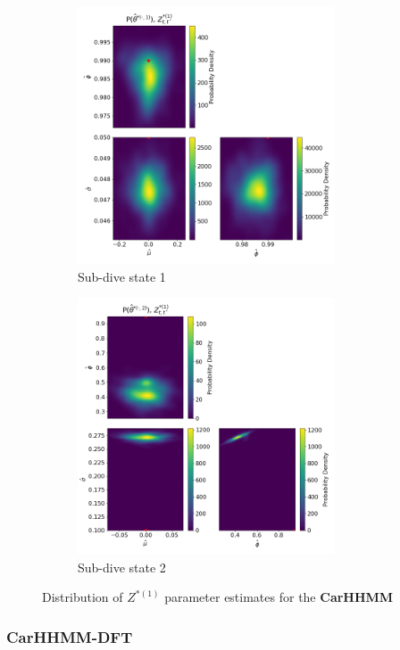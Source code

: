 \documentclass[12pt]{TD-CJS}
\begin{document}
\begin{figure}[ht]
	\centering
	\begin{subfigure}[t]{\textwidth}
        \centering
        \includegraphics[height=3in]{../Plots/hhmm_V_MLE_density_A_0_0.png}
        \caption{Sub-dive state 1}
    \end{subfigure}
    \newline
    \begin{subfigure}[t]{\textwidth}
        \centering
        \includegraphics[height=3in]{../Plots/hhmm_V_MLE_density_A_0_1.png}
        \caption{Sub-dive state 2}
    \end{subfigure}
    \caption{Distribution of $Z^{*(1)}$ parameter estimates for the \textbf{CarHHMM}}
\end{figure}

\subsubsection{CarHHMM-DFT}
\end{document}
